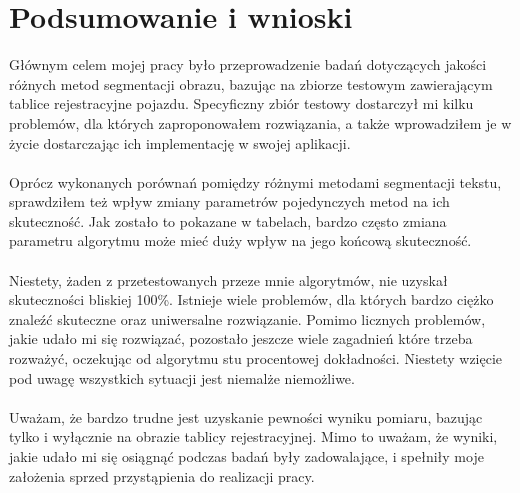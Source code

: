\section{Podsumowanie i wnioski}
Głównym celem mojej pracy było przeprowadzenie badań dotyczących jakości różnych metod segmentacji obrazu, bazując na zbiorze testowym zawierającym tablice rejestracyjne pojazdu. Specyficzny zbiór testowy dostarczył mi kilku problemów, dla których zaproponowałem rozwiązania, a także wprowadziłem je w życie dostarczając ich implementację w swojej aplikacji.
\paragraph{}
Oprócz wykonanych porównań pomiędzy różnymi metodami segmentacji tekstu, sprawdziłem też wpływ zmiany parametrów pojedynczych metod na ich skuteczność. Jak zostało to pokazane w tabelach, bardzo często zmiana parametru algorytmu może mieć duży wpływ na jego końcową skuteczność.
\paragraph{}
Niestety, żaden z przetestowanych przeze mnie algorytmów, nie uzyskał skuteczności bliskiej 100\%. Istnieje wiele problemów, dla których bardzo ciężko znaleźć skuteczne oraz uniwersalne rozwiązanie. Pomimo licznych problemów, jakie udało mi się rozwiązać, pozostało jeszcze wiele zagadnień które trzeba rozważyć, oczekując od algorytmu stu procentowej dokładności. Niestety wzięcie pod uwagę wszystkich sytuacji jest niemalże niemożliwe.
\paragraph{}
Uważam, że bardzo trudne jest uzyskanie pewności wyniku pomiaru, bazując tylko i wyłącznie na obrazie tablicy rejestracyjnej. Mimo to uważam, że wyniki, jakie udało mi się osiągnąć podczas badań były zadowalające, i spełniły moje założenia sprzed przystąpienia do realizacji pracy.
